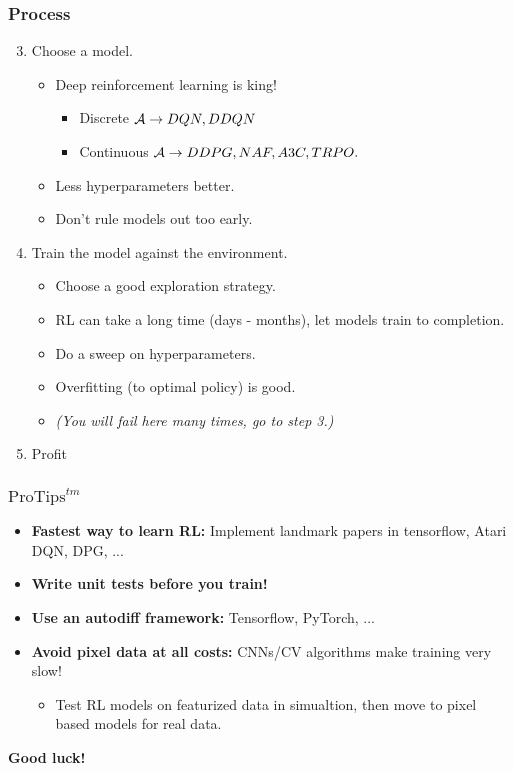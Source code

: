 \begin{frame}
\frametitle{Process}
\begin{enumerate}

	\setcounter{enumi}{2}
	\item Choose a model.
	\begin{itemize}
		\item Deep reinforcement learning is king! 
		\begin{itemize}
			\item Discrete ${\mathcal A} \to DQN, DDQN$
			\item Continuous ${\mathcal A} \to DDPG, NAF, A3C, TRPO.$	
		\end{itemize}
		\item Less hyperparameters better.
		\item Don't rule models out too early.
	\end{itemize}
	\item Train the model against the environment.
	\begin{itemize}
		\item Choose a good exploration strategy.
		\item RL can take a long time (days - months), let models train to completion.
		\item Do a sweep on hyperparameters.
		\item Overfitting (to optimal policy) is good. 
		\item \emph{(You will fail here many times, go to step 3.)}
	\end{itemize}
	\item Profit
\end{enumerate}
\end{frame}



\begin{frame}
\frametitle{$\text{ProTips}^{tm}$}
\begin{itemize}
	\item \textbf{Fastest way to learn RL:} Implement landmark papers in tensorflow, Atari DQN, DPG, ...
	\item \textbf{Write unit tests before you train!}
	\item \textbf{Use an autodiff framework: } Tensorflow, PyTorch, ...
	\item \textbf{Avoid pixel data at all costs: } CNNs/CV algorithms make training very slow!
	\begin{itemize}
		\item Test RL models on featurized data in simualtion, then move to pixel based models for real data.
	\end{itemize}
\end{itemize}
\begin{center}
	\textbf{Good luck!}
\end{center}
\end{frame}
